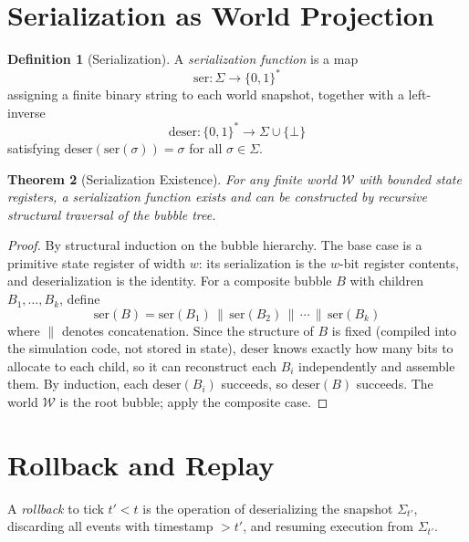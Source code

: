 \documentclass[11pt,a4paper,openany]{book}
\theoremstyle{plain}
\newtheorem{theorem}{Theorem}[chapter]
\theoremstyle{definition}
\newtheorem{definition}[theorem]{Definition}
\theoremstyle{remark}
\newenvironment{defbox}[1]{%
  \begin{tcolorbox}[
    title={\textbf{Definition:} #1},
    colback=defbg,
    colframe=sphereamber!80,
    fonttitle=\bfseries,
    coltitle=sphereamber!60!black,
    sharp corners,
    breakable,
    before upper={\normalfont\setlength{\parindent}{0pt}\tolerance=9999\hbadness=9999}
  ]
}{\end{tcolorbox}}
\newcommand{\world}{\ensuremath{\mathcal{W}}}
\begin{document}
\section{Serialization as World Projection}

\begin{definition}[Serialization]
  A \emph{serialization function} is a map
  \[
    \mathrm{ser} : \Sigma \to \{0,1\}^*
  \]
  assigning a finite binary string to each world snapshot, together with
  a left-inverse
  \[
    \mathrm{deser} : \{0,1\}^* \to \Sigma \cup \{\bot\}
  \]
  satisfying $\mathrm{deser}(\mathrm{ser}(\sigma)) = \sigma$ for all
  $\sigma \in \Sigma$.
\end{definition}

\begin{theorem}[Serialization Existence]
  For any finite world $\world$ with bounded state registers, a
  serialization function exists and can be constructed by recursive
  structural traversal of the bubble tree.
\end{theorem}
\begin{proof}
  By structural induction on the bubble hierarchy. The base case is a
  primitive state register of width $w$: its serialization is the $w$-bit
  register contents, and deserialization is the identity. For a composite
  bubble $B$ with children $B_1, \ldots, B_k$, define
  \[
    \mathrm{ser}(B) = \mathrm{ser}(B_1) \,\|\, \mathrm{ser}(B_2)
    \,\|\, \cdots \,\|\, \mathrm{ser}(B_k)
  \]
  where $\|$ denotes concatenation. Since the structure of $B$ is fixed
  (compiled into the simulation code, not stored in state),
  $\mathrm{deser}$ knows exactly how many bits to allocate to each child,
  so it can reconstruct each $B_i$ independently and assemble them.
  By induction, each $\mathrm{deser}(B_i)$ succeeds, so
  $\mathrm{deser}(B)$ succeeds. The world $\world$ is the root bubble;
  apply the composite case.
\end{proof}

\section{Rollback and Replay}

\begin{defbox}{Rollback}
  A \emph{rollback} to tick $t' < t$ is the operation of deserializing
  the snapshot $\Sigma_{t'}$, discarding all events with timestamp
  $> t'$, and resuming execution from $\Sigma_{t'}$.
\end{defbox}
\end{document}
